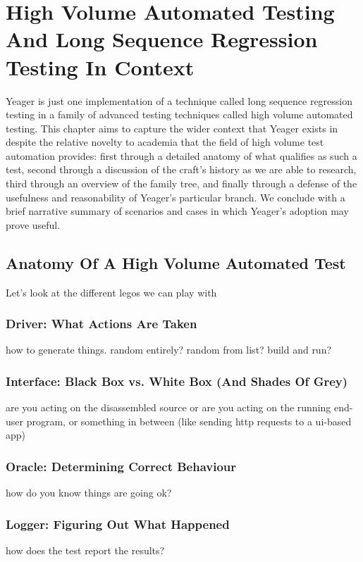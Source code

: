 \chapter{High Volume Automated Testing And Long Sequence Regression Testing In Context}
Yeager is just one implementation of a technique called long sequence regression testing in a family of advanced testing techniques called high volume automated testing. This chapter aims to capture the wider context that Yeager exists in despite the relative novelty to academia that the field of high volume test automation provides: first through a detailed anatomy of what qualifies as such a test, second through a discussion of the craft's history as we are able to research, third through an overview of the family tree, and finally through a defense of the usefulness and reasonability of Yeager's particular branch. We conclude with a brief narrative summary of scenarios and cases in which Yeager's adoption may prove useful.

\section{Anatomy Of A High Volume Automated Test}
Let's look at the different legos we can play with %

\subsection{Driver: What Actions Are Taken}
how to generate things. random entirely? random from list? build and run? %

\subsection{Interface: Black Box vs. White Box (And Shades Of Grey)}
are you acting on the disassembled source or are you acting on the running end-user program, or something in between (like sending http requests to a ui-based app) %

\subsection{Oracle: Determining Correct Behaviour}
how do you know things are going ok? %

\subsection{Logger: Figuring Out What Happened}
how does the test report the results? %

